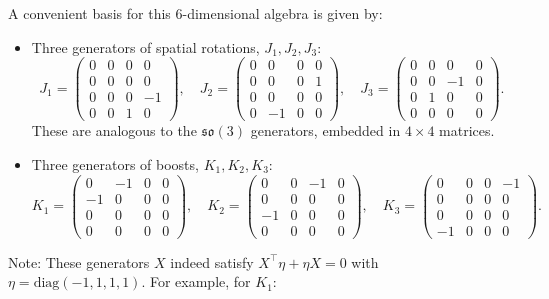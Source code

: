 \documentclass{amsart}
\theoremstyle{definition}
\theoremstyle{remark}
\begin{document}
A convenient basis for this 6-dimensional algebra is given by:
\begin{itemize}
    \item Three generators of spatial rotations, $J_1, J_2, J_3$:
    \begin{equation*} 
      J_1 = \begin{pmatrix} 0&0&0&0 \\ 0&0&0&0 \\ 0&0&0&-1 \\ 0&0&1&0 \end{pmatrix}, \quad
      J_2 = \begin{pmatrix} 0&0&0&0 \\ 0&0&0&1 \\ 0&0&0&0 \\ 0&-1&0&0 \end{pmatrix}, \quad
      J_3 = \begin{pmatrix} 0&0&0&0 \\ 0&0&-1&0 \\ 0&1&0&0 \\ 0&0&0&0 \end{pmatrix}.
    \end{equation*}
    These are analogous to the $\mathfrak{so}(3)$ generators, embedded in $4 \times 4$ matrices.
    \item Three generators of boosts, $K_1, K_2, K_3$:
    \begin{equation*} 
      K_1 = \begin{pmatrix} 0&-1&0&0 \\ -1&0&0&0 \\ 0&0&0&0 \\ 0&0&0&0 \end{pmatrix}, \quad
      K_2 = \begin{pmatrix} 0&0&-1&0 \\ 0&0&0&0 \\ -1&0&0&0 \\ 0&0&0&0 \end{pmatrix}, \quad
      K_3 = \begin{pmatrix} 0&0&0&-1 \\ 0&0&0&0 \\ 0&0&0&0 \\ -1&0&0&0 \end{pmatrix}.
    \end{equation*}
\end{itemize}
Note: These generators $X$ indeed satisfy $X^\top \eta + \eta X = 0$ with $\eta=\mathrm{diag}(-1,1,1,1)$. For example, for $K_1$:
\end{document}
